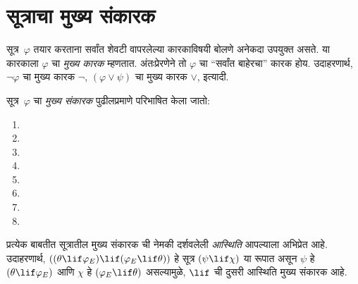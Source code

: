 \section{सूत्राचा मुख्य संकारक}\label{fol:syn:mai:sec}

\begin{explain}
सूत्र~$\varphi$ तयार करताना सर्वांत शेवटी वापरलेल्या कारकाविषयी
बोलणे अनेकदा उपयुक्त असते. या कारकाला $\varphi$ चा \emph{मुख्य कारक}
म्हणतात. अंतःप्रेरणेने तो $\varphi$ चा ``सर्वांत बाहेरचा'' कारक होय.
उदाहरणार्थ, $\lnot \varphi$ चा मुख्य कारक $\lnot$, $(\varphi \lor \psi)$ चा
मुख्य कारक $\lor$, इत्यादी.
\end{explain}


\begin{defn}[मुख्य संकारक]
\label{fol:syn:mai:def:main-op}
सूत्र~$\varphi$ चा \emph{मुख्य संकारक} पुढीलप्रमाणे परिभाषित केला जातो:
\begin{enumerate}
\item {}

\item {}

\item {}

\item {}

\item {}

\item {}

\item {}

\item {}
\end{enumerate}
\end{defn}

प्रत्येक बाबतीत सूत्रातील मुख्य संकारक ची नेमकी दर्शवलेली
\emph{आस्थिति} आपल्याला अभिप्रेत आहे. उदाहरणार्थ,
$((\theta \lif \varphi_{E}) \lif (\varphi_{E} \lif \theta))$ हे सूत्र $(\psi \lif \chi)$ या रूपात
असून $\psi$ हे $(\theta \lif \varphi_{E})$ आणि $\chi$ हे $(\varphi_{E} \lif \theta)$ असल्यामुळे,
$\lif$ ची दुसरी आस्थिति मुख्य संकारक आहे.

